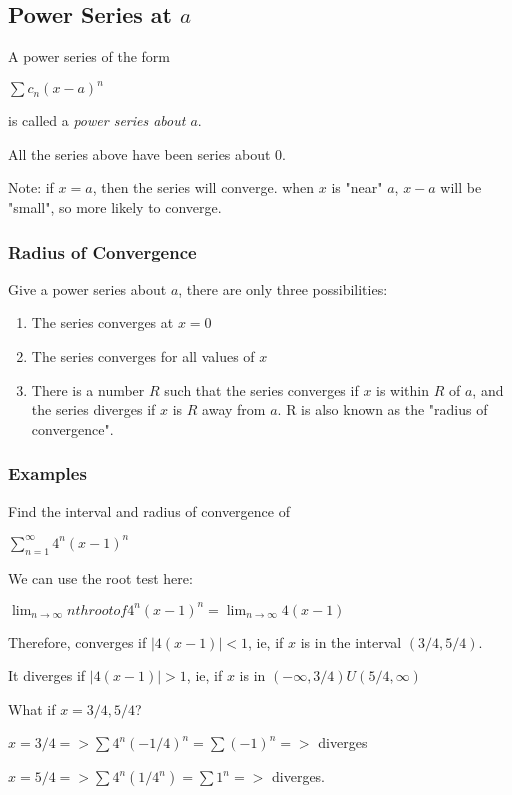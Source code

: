\documentclass{article}
\begin{document}
\subsection{Power Series at $a$}

A power series of the form 

$\sum c_n(x-a)^n$

is called a \textit{power series about $a$}.

All the series above have been series about 0. 

Note: if $x=a$, then the series will converge. when $x$ is "near" $a$, $x-a$ will be "small", so more likely to converge.

\subsubsection{Radius of Convergence}

Give a power series about $a$, there are only three possibilities: 

\begin{enumerate}
    \item The series converges at $x=0$
    \item The series converges for all values of $x$
    \item There is a number $R$ such that the series converges if $x$ is within $R$ of $a$, and the series diverges if $x$ is $R$ away from $a$. R is also known as the "radius of convergence".
\end{enumerate}

\subsubsection{Examples}

Find the interval and radius of convergence of 

$\sum_{n=1}^{\infty} 4^n(x-1)^n$

We can use the root test here: 

$\lim_{n\to\infty} nth root of 4^n(x-1)^n = \lim_{n\to\infty} 4(x-1)$

Therefore, converges if $|4(x-1)| < 1$, ie, if $x$ is in the interval $(3/4, 5/4)$.

It diverges if $|4(x-1)|>1$, ie, if $x$ is in $(-\infty,3/4)U(5/4,\infty)$

What if $x=3/4,5/4$? 

    $x=3/4 => \sum 4^n(-1/4)^n = \sum (-1)^n => $ diverges
    
    $x=5/4 => \sum 4^n(1/4^n) = \sum 1^n => $ diverges.
    
\end{document}
